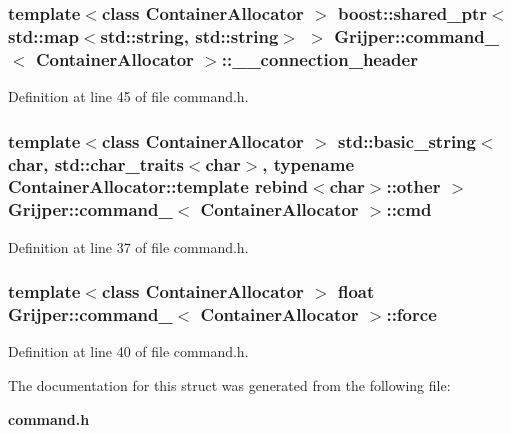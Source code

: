 \subsubsection[{\-\_\-\-\_\-connection\-\_\-header}]{\setlength{\rightskip}{0pt plus 5cm}template$<$class Container\-Allocator $>$ boost\-::shared\-\_\-ptr$<$std\-::map$<$std\-::string, std\-::string$>$ $>$ {\bf Grijper\-::command\-\_\-}$<$ Container\-Allocator $>$\-::\-\_\-\-\_\-connection\-\_\-header}\label{structGrijper_1_1command___a60dc33f9ae6d91cb9f985c810cfb607a}


Definition at line 45 of file command.\-h.

\subsubsection[{cmd}]{\setlength{\rightskip}{0pt plus 5cm}template$<$class Container\-Allocator $>$ std\-::basic\-\_\-string$<$char, std\-::char\-\_\-traits$<$char$>$, typename Container\-Allocator\-::template rebind$<$char$>$\-::other $>$ {\bf Grijper\-::command\-\_\-}$<$ Container\-Allocator $>$\-::cmd}\label{structGrijper_1_1command___af8d8acb6f12316fbbf78d60dcf4e7f11}


Definition at line 37 of file command.\-h.

\subsubsection[{force}]{\setlength{\rightskip}{0pt plus 5cm}template$<$class Container\-Allocator $>$ float {\bf Grijper\-::command\-\_\-}$<$ Container\-Allocator $>$\-::force}\label{structGrijper_1_1command___ad51f4dcb43fa3fa5d8564e8564f8df3f}


Definition at line 40 of file command.\-h.



The documentation for this struct was generated from the following file\-:\begin{DoxyCompactItemize}
\item 
{\bf command.\-h}\end{DoxyCompactItemize}
